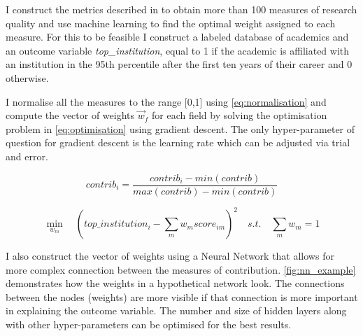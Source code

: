 \documentclass[10pt]{report}
\begin{document}
\vspace{10pt}


I construct the metrics described in \textcite{Waltman2016} to obtain more than 100 measures of research quality and use machine learning to find the optimal weight assigned to each measure. For this to be feasible I construct a labeled database of academics and an outcome variable \textit{top\_institution}, equal to 1 if the academic is affiliated with an institution in the 95th percentile after the first ten years of their career and 0 otherwise.

I normalise all the measures to the range [0,1] using \autoref{eq:normalisation} and compute the vector of weights \(\vec{w}_f\) for each field by solving the optimisation problem in \autoref{eq:optimisation} using gradient descent. The only hyper-parameter of question for gradient descent is the learning rate which can be adjusted via trial and error.

\begin{equation}
    \label{eq:normalisation}
    contrib_i = \frac{contrib_i - min(contrib)}{max(contrib) - min(contrib)}
\end{equation}

\begin{equation}
    \label{eq:optimisation}
    \min_{w_m} \quad (top\_institution_i - \sum_m w_m score_{im})^2 \quad s.t. \quad \sum_{m} w_m = 1
\end{equation}

I also construct the vector of weights using a Neural Network that allows for more complex connection between the measures of contribution. \autoref{fig:nn_example} demonstrates how the weights in a hypothetical network look. The connections between the nodes (weights) are more visible if that connection is more important in explaining the outcome variable. The number and size of hidden layers along with other hyper-parameters can be optimised for the best results.
\end{document}
